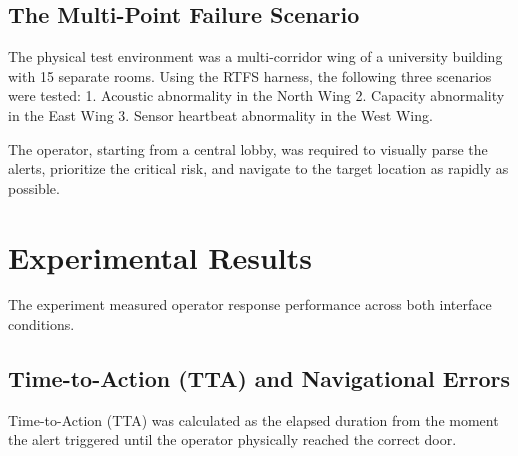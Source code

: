 \documentclass[conference]{IEEEtran}
\begin{document}
\subsection{The Multi-Point Failure Scenario}
The physical test environment was a multi-corridor wing of a university building with 15 separate rooms. Using the RTFS harness, the following three scenarios were tested: 1. Acoustic abnormality in the North Wing 2. Capacity abnormality in the East Wing 3. Sensor heartbeat abnormality in the West Wing.

The operator, starting from a central lobby, was required to visually parse the alerts, prioritize the critical risk, and navigate to the target location as rapidly as possible.

\section{Experimental Results}

The experiment measured operator response performance across both interface conditions.

\subsection{Time-to-Action (TTA) and Navigational Errors}
Time-to-Action (TTA) was calculated as the elapsed duration from the moment the alert triggered until the operator physically reached the correct door.

\begin{table}[htbp]
\caption{Time-to-Action and Error Performance}
\begin{center}
\end{center}
\end{table}
\end{document}
